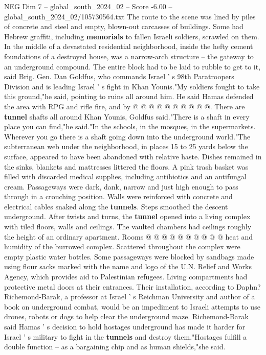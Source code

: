 \begin{textsample}{NEG Dim 7 – global\_south\_2024\_02 – Score -6.00 – global\_south\_2024\_02/105730564.txt}
The route to the scene was lined by piles of concrete and steel and empty, blown-out carcasses of buildings.
Some had Hebrew graffiti, including \textbf{memorials} to fallen Israeli soldiers, scrawled on them.
In the middle of a devastated residential neighborhood, inside the hefty cement foundations of a destroyed house, was a narrow-arch structure -- the gateway to an underground compound.
The entire block had to be laid to rubble to get to it, said Brig.
Gen.
Dan Goldfus, who commands Israel ' s 98th Paratroopers Division and is leading Israel ' s fight in Khan Younis."My soldiers fought to take this ground,"he said, pointing to ruins all around him.
He said Hamas defended the area with RPG and rifle fire, and by @ @ @ @ @ @ @ @ @ @.
There are \textbf{tunnel} shafts all around Khan Younis, Goldfus said."There is a shaft in every place you can find,"he said."In the schools, in the mosques, in the supermarkets.
Wherever you go there is a shaft going down into the underground world."The subterranean web under the neighborhood, in places 15 to 25 yards below the surface, appeared to have been abandoned with relative haste.
Dishes remained in the sinks, blankets and mattresses littered the floors.
A pink trash basket was filled with discarded medical supplies, including antibiotics and an antifungal cream.
Passageways were dark, dank, narrow and just high enough to pass through in a crouching position.
Walls were reinforced with concrete and electrical cables snaked along the \textbf{tunnels}.
Steps smoothed the descent underground.
After twists and turns, the \textbf{tunnel} opened into a living complex with tiled floors, walls and ceilings.
The vaulted chambers had ceilings roughly the height of an ordinary apartment.
Rooms @ @ @ @ @ @ @ @ @ @ heat and humidity of the burrowed complex.
Scattered throughout the complex were empty plastic water bottles.
Some passageways were blocked by sandbags made using flour sacks marked with the name and logo of the U.N.
Relief and Works Agency, which provides aid to Palestinian refugees.
Living compartments had protective metal doors at their entrances.
Their installation, according to Daphn?
Richemond-Barak, a professor at Israel ' s Reichman University and author of a book on underground combat, would be an impediment to Israeli attempts to use drones, robots or dogs to help clear the underground maze.
Richemond-Barak said Hamas ' s decision to hold hostages underground has made it harder for Israel ' s military to fight in the \textbf{tunnels} and destroy them."Hostages fulfill a double function -- as a bargaining chip and as human shields,"she said.

\end{textsample}
